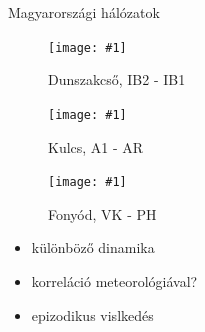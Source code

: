 \documentclass{beamer}
\newcommand\figu[3]{
    \begin{figure}
        \texttt{[image: \#1]}
        \caption{#3}
    \end{figure}
}
\begin{document}
\begin{frame}{Magyarországi hálózatok}

\begin{minipage}[c]{0.975\textwidth}
    \begin{minipage}[c]{0.47\textwidth}
        \figu{IB2-IB1_kalman.pdf}{1.0}{Dunszakcső, IB2 - IB1}
    \end{minipage}
    \begin{minipage}[c]{0.47\textwidth}
        \figu{A1-AR_kalman.pdf}{1.0}{Kulcs, A1 - AR}
    \end{minipage}
\end{minipage}
\begin{minipage}[c]{0.975\textwidth}
    \begin{minipage}[c]{0.47\textwidth}
        \figu{KV-PH_kalman.pdf}{1.0}{Fonyód, VK - PH}
    \end{minipage}
    \begin{minipage}[c]{0.475\textwidth}
        \begin{itemize}
            \item különböző dinamika
            \item korreláció meteorológiával?
            \item epizodikus vislkedés
        \end{itemize}
    \end{minipage}
\end{minipage}
\end{frame}
\end{document}
